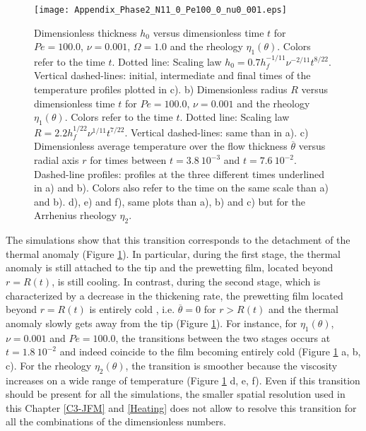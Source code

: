 \begin{figure}[h!]
  \begin{center}
    \graphicspath{ {/Users/thorey/Documents/These/Projet/Refroidissement/Skin_Model/Figure/Figure_Heating/} }
    \texttt{[image: Appendix\_Phase2\_N11\_0\_Pe100\_0\_nu0\_001.eps]}
    \caption{Dimensionless thickness  $h_0$ versus  dimensionless time
      $t$ for  $Pe=100.0$, $\nu=0.001$, $\Omega=1.0$ and  the rheology
      $\eta_1(\theta)$.  Colors  refer to the time  $t$.  Dotted line:
      Scaling  law $h_0=  0.7h_f^{-1/11}\nu^{-2/11}t^{8/22}$. Vertical
      dashed-lines:  initial,  intermediate  and final  times  of  the
      temperature profiles plotted in c).  b) Dimensionless radius $R$
      versus dimensionless  time $t$  for $Pe=100.0$,  $\nu=0.001$ and
      the rheology  $\eta_1(\theta)$.  Colors  refer to the  time $t$.
      Dotted line:  Scaling law  $R= 2.2h_f^{1/22}\nu^{1/11}t^{7/22}$.
      Vertical dashed-lines: same than in a). c) Dimensionless average
      temperature over  the flow thickness  $\overline{\theta}$ versus
      radial   axis  $r$   for  times   between  $t=3.8~10^{-3}$   and
      $t=7.6~10^{-2}$.   Dashed-line profiles:  profiles at  the three
      different times  underlined in a)  and b). Colors also  refer to
      the time on the same scale than  a) and b).  d), e) and f), same
      plots  than  a),  b)  and  c) but  for  the  Arrhenius  rheology
      $\eta_2$.}
    \label{C4-Appendix_Phase2_N11_0_Pe100_0_nu0_001}
  \end{center}
\end{figure}

The  simulations   show  that  this  transition   corresponds  to  the
detachment       of       the      thermal       anomaly       (Figure
\ref{C4-Appendix_Phase2_N11_0_Pe100_0_nu0_001}).     In    particular,
during the first  stage, the thermal anomaly is still  attached to the
tip  and  the  prewetting  film, located  beyond  $r=R(t)$,  is  still
cooling.  In contrast, during the second stage, which is characterized
by  a decrease  in the  thickening rate,  the prewetting  film located
beyond $r=R(t)$  is entirely cold  , i.e.  $\overline{\theta}  =0$ for
$r>R(t)$ and the thermal anomaly slowly gets away from the tip (Figure
\ref{C4-Appendix_Phase2_N11_0_Pe100_0_nu0_001}).   For  instance,  for
$\eta_1(\theta)$, $\nu=0.001$ and  $Pe=100.0$, the transitions between
the two  stages occurs at  $t=1.8~10^{-2}$ and indeed coincide  to the
film          becoming          entirely         cold          (Figure
\ref{C4-Appendix_Phase2_N11_0_Pe100_0_nu0_001}  a,  b,  c).   For  the
rheology  $\eta_2(\theta)$, the  transition  is  smoother because  the
viscosity   increases  on   a  wide   range  of   temperature  (Figure
\ref{C4-Appendix_Phase2_N11_0_Pe100_0_nu0_001} d, e,  f). Even if this
transition  should be  present for  all the  simulations, the  smaller
spatial resolution used in this Chapter \ref{C3-JFM} and \ref{Heating}
does not allow to resolve this  transition for all the combinations of
the dimensionless numbers.

